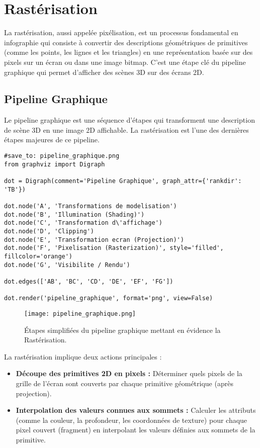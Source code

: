 \documentclass{article}
\begin{document}
\sloppy

\section{Rastérisation}

La rastérisation, aussi appelée pixélisation, est un processus fondamental en infographie qui consiste à convertir des descriptions géométriques de primitives (comme les points, les lignes et les triangles) en une représentation basée sur des pixels sur un écran ou dans une image bitmap. C'est une étape clé du pipeline graphique qui permet d'afficher des scènes 3D sur des écrans 2D.

\subsection{Pipeline Graphique}
Le pipeline graphique est une séquence d'étapes qui transforment une description de scène 3D en une image 2D affichable. La rastérisation est l'une des dernières étapes majeures de ce pipeline.

\begin{verbatim}
#save_to: pipeline_graphique.png
from graphviz import Digraph

dot = Digraph(comment='Pipeline Graphique', graph_attr={'rankdir': 'TB'})

dot.node('A', 'Transformations de modelisation')
dot.node('B', 'Illumination (Shading)')
dot.node('C', 'Transformation d\'affichage')
dot.node('D', 'Clipping')
dot.node('E', 'Transformation ecran (Projection)')
dot.node('F', 'Pixelisation (Rasterization)', style='filled', fillcolor='orange')
dot.node('G', 'Visibilite / Rendu')

dot.edges(['AB', 'BC', 'CD', 'DE', 'EF', 'FG'])

dot.render('pipeline_graphique', format='png', view=False)
\end{verbatim}

\begin{figure}[H]
\centering
\texttt{[image: pipeline\_graphique.png]}
\caption{Étapes simplifiées du pipeline graphique mettant en évidence la Rastérisation.}
\label{fig:pipeline_graphique}
\end{figure}

La rastérisation implique deux actions principales :
\begin{itemize}
    \item \textbf{Découpe des primitives 2D en pixels :} Déterminer quels pixels de la grille de l'écran sont couverts par chaque primitive géométrique (après projection).
    \item \textbf{Interpolation des valeurs connues aux sommets :} Calculer les attributs (comme la couleur, la profondeur, les coordonnées de texture) pour chaque pixel couvert (fragment) en interpolant les valeurs définies aux sommets de la primitive.
\end{itemize}
\end{document}

